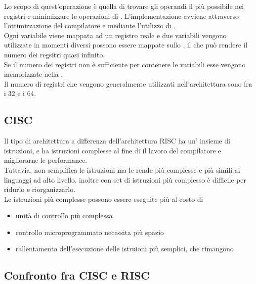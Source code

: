 \documentclass[arch.tex]{subfiles}
\begin{document}
%
\label{par:otimizzazione_dei_registri}
Lo scopo di quest'operazione è quella di trovare gli operandi il più possibile nei registri
e minimizzare le operazioni di . L'implementazione  avviene
attraverso l'ottimizzazione del compilatore e mediante l'utilizzo di .\\
Ogni variabile viene mappata ad un registro reale e  due variabili vengono utilizzate
in momenti diversi possono essere mappate sullo , il che può rendere il
numero dei regsitri quasi infinito.\\ 
Se il numero dei registri non è sufficiente per contenere  le variabili esse
vengono memorizzate nella .\\
Il numero di registri che vengono generalmente utilizzati nell'architettura  sono
fra i 32 e i 64.

\subsection{CISC}%
\label{sub:cisc}
Il tipo di architettura   a differenza 
dell'architettura RISC ha un' insieme di istruzioni, e ha istruzioni 
 complesse al fine di  il lavoro del compilatore e migliorarne le
performance.\\
Tuttavia, non semplifica le istruzioni ma le rende più complesse e più simili ai linguaggi ad
alto livello, inoltre con set di istruzioni più complesso è difficile  per ridurlo e riorganizzarlo.\\
Le istruzioni più complesse possono essere eseguite più   al costo di

\begin{itemize}
	\item unità di controllo più complessa
	\item controllo microprogrammato necessita più spazio
	\item rallentamento dell'esecuzione delle istruioni più semplici, che rimangono
\end{itemize}

\subsection{Confronto fra CISC e RISC}%
\label{sub:confronto_fra_cisc_e_risc}
\end{document}
